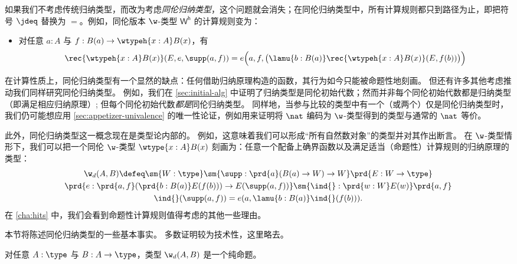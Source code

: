 %
%
如果我们不考虑传统归纳类型，而改为考虑\emph{同伦归纳类型}，这个问题就会消失；在同伦归纳类型中，所有计算规则都只到路径为止，即把符号 $\jdeq$ 替换为 $=$。例如，同伦版本 $\w$-类型 $\mathsf{W^h}$ 的计算规则变为：
%
\begin{itemize}
\item 对任意 $a : A$ 与 $f : B(a) \to \wtypeh{x:A} B(x)$，有
\begin{equation*}
  \rec{\wtypeh{x:A} B(x)}(E,e,\supp(a,f)) = e\Big(a,f,\big(\lamu{b:B(a)} \rec{\wtypeh{x:A} B(x)}(E,f(b))\big)\Big)
\end{equation*}
\end{itemize}

在计算性质上，同伦归纳类型有一个显然的缺点：任何借助归纳原理构造的函数，其行为如今只能被命题性地刻画。
但还有许多其他考虑推动我们同样研究同伦归纳类型。
例如，我们在 \cref{sec:initial-alg} 中证明了归纳类型是同伦初始代数；然而并非每个同伦初始代数都是归纳类型（即满足相应归纳原理）; 但每个同伦初始代数\emph{都是}同伦归纳类型。
同样地，当参与比较的类型中有一个（或两个）仅是同伦归纳类型时，我们仍可能想应用 \cref{sec:appetizer-univalence} 的唯一性论证，例如用来证明将 $\nat$ 编码为 $\w$-类型得到的类型与通常的 $\nat$ 等价。

此外，同伦归纳类型这一概念现在是类型论内部的。
例如，这意味着我们可以形成“所有自然数对象”的类型并对其作出断言。
在 $\w$-类型情形下，我们可以把一个同伦 $\w$-类型 $\wtype{x:A} B(x)$ 刻画为：任意一个配备上确界函数以及满足适当（命题性）计算规则的归纳原理的类型：
\begin{multline*}
\w_d(A,B) \defeq \sm{W : \type}
                 \sm{\supp : \prd {a} (B(a) \to W) \to W}
                 \prd{E : W \to \type} \\
                 \prd{e : \prd{a,f} (\prd{b : B(a)} E(f(b))) \to E(\supp(a,f))}
                 \sm{\ind{} : \prd{w : W} E(w)}
                 \prd{a,f} \\
                 \ind{}(\supp(a,f)) = e(a,\lamu{b:B(a)} \ind{}(f(b))).
\end{multline*}
在 \cref{cha:hits} 中，我们会看到命题性计算规则值得考虑的其他一些理由。

本节将陈述同伦归纳类型的一些基本事实。
多数证明较为技术性，这里略去。

\begin{thm}
  对任意 $A : \type$ 与 $B : A \to \type$，类型 $\w_d(A,B)$ 是一个纯命题。
\end{thm}

